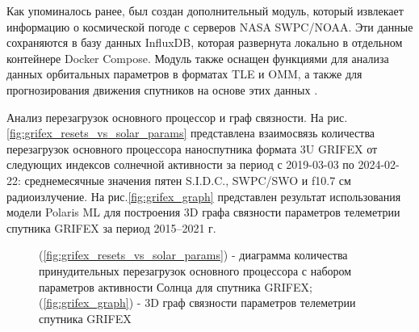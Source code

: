 \documentclass[12pt, a4paper]{extreport}
\begin{document}
Как упоминалось ранее, был создан дополнительный модуль, который извлекает информацию о космической погоде с серверов NASA SWPC/NOAA. Эти данные сохраняются в базу данных InfluxDB, которая развернута локально в отдельном контейнере Docker Compose. Модуль также оснащен функциями для анализа данных орбитальных параметров в форматах TLE и OMM, а также для прогнозирования движения спутников на основе этих данных \cite{bottou1991stochastic}\cite{killick2012optimal}.

Анализ перезагрузок основного процессор и граф связности. На рис.\ref{fig:grifex_resets_vs_solar_params} представлена взаимосвязь количества перезагрузок основного процессора наноспутника формата 3U GRIFEX от следующих индексов солнечной активности за период с 2019-03-03 по 2024-02-22: среднемесячные значения пятен S.I.D.C., SWPC/SWO и f10.7 см радиоизлучение. На рис.\ref{fig:grifex_graph} представлен результат использования модели Polaris ML для построения 3D графа связности параметров телеметрии спутника GRIFEX за период 2015–2021 г.

\begin{figure}[htbp]
	\centering
	\hfill %
	\caption{(\ref{fig:grifex_resets_vs_solar_params}) - диаграмма количества принудительных перезагрузок основного процессора с набором параметров активности Солнца для спутника GRIFEX; (\ref{fig:grifex_graph}) - 3D граф связности параметров телеметрии спутника GRIFEX}
	\label{fig:combined_figure}
\end{figure}
\end{document}

